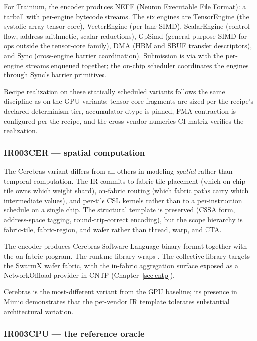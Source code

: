 For Trainium, the encoder produces NEFF (Neuron Executable File Format): a tarball with per-engine bytecode streams.
The six engines are TensorEngine (the systolic-array tensor core), VectorEngine (per-lane SIMD), ScalarEngine (control flow, address arithmetic, scalar reductions), GpSimd (general-purpose SIMD for ops outside the tensor-core family), DMA (HBM and SBUF transfer descriptors), and Sync (cross-engine barrier coordination).
Submission is via  with the per-engine streams enqueued together; the on-chip scheduler coordinates the engines through Sync's barrier primitives.

Recipe realization on these statically scheduled variants follows the same discipline as on the GPU variants: tensor-core fragments are sized per the recipe's declared determinism tier, accumulator dtype is pinned, FMA contraction is configured per the recipe, and the cross-vendor numerics CI matrix verifies the realization.

\subsubsection{IR003CER --- spatial computation}
\label{sec:ir003-cer}

The Cerebras variant differs from all others in modeling \emph{spatial} rather than temporal computation.
The IR commits to fabric-tile placement (which on-chip tile owns which weight shard), on-fabric routing (which fabric paths carry which intermediate values), and per-tile CSL kernels rather than to a per-instruction schedule on a single chip.
The structural template is preserved (CSSA form, address-space tagging, round-trip-correct encoding), but the scope hierarchy is fabric-tile, fabric-region, and wafer rather than thread, warp, and CTA.

The encoder produces Cerebras Software Language binary format together with the on-fabric program.
The runtime library wraps .
The collective library targets the SwarmX wafer fabric, with the in-fabric aggregation surface exposed as a NetworkOffload provider in CNTP (Chapter~\ref{sec:cntp}).

Cerebras is the most-different variant from the GPU baseline; its presence in Mimic demonstrates that the per-vendor IR template tolerates substantial architectural variation.

\subsubsection{IR003CPU --- the reference oracle}
\label{sec:ir003-cpu}

